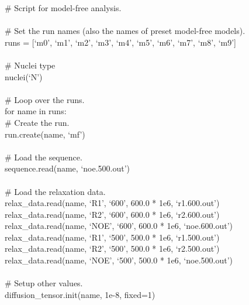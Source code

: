 \begin{exampleenv}
\# Script for model-free analysis. \\
 \\
\# Set the run names (also the names of preset model-free models). \\
runs = [`m0', `m1', `m2', `m3', `m4', `m5', `m6', `m7', `m8', `m9'] \\
 \\
\# Nuclei type \\
nuclei(`N') \\
 \\
\# Loop over the runs. \\
for name in runs: \\
\hspace*{4ex} \# Create the run. \\
\hspace*{4ex} run.create(name, `mf') \\
 \\
\hspace*{4ex} \# Load the sequence. \\
\hspace*{4ex} sequence.read(name, `noe.500.out') \\
 \\
\hspace*{4ex} \# Load the relaxation data. \\
\hspace*{4ex} relax\_data.read(name, `R1', `600', 600.0 * 1e6, `r1.600.out') \\
\hspace*{4ex} relax\_data.read(name, `R2', `600', 600.0 * 1e6, `r2.600.out') \\
\hspace*{4ex} relax\_data.read(name, `NOE', `600', 600.0 * 1e6, `noe.600.out') \\
\hspace*{4ex} relax\_data.read(name, `R1', `500', 500.0 * 1e6, `r1.500.out') \\
\hspace*{4ex} relax\_data.read(name, `R2', `500', 500.0 * 1e6, `r2.500.out') \\
\hspace*{4ex} relax\_data.read(name, `NOE', `500', 500.0 * 1e6, `noe.500.out') \\
 \\
\hspace*{4ex} \# Setup other values. \\
\hspace*{4ex} diffusion\_tensor.init(name, 1e-8, fixed=1) \\

\end{exampleenv}

